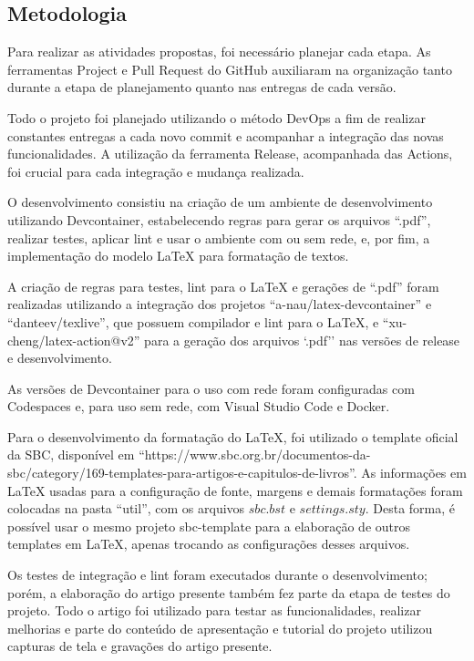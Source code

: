 \subsection{Metodologia}

Para realizar as atividades propostas, foi necessário planejar cada etapa. As ferramentas Project e Pull Request do GitHub auxiliaram na organização tanto durante a etapa de planejamento quanto nas entregas de cada versão.

Todo o projeto foi planejado utilizando o método DevOps a fim de realizar constantes entregas a cada novo commit e acompanhar a integração das novas funcionalidades. A utilização da ferramenta Release, acompanhada das Actions, foi crucial para cada integração e mudança realizada.

O desenvolvimento consistiu na criação de um ambiente de desenvolvimento utilizando Devcontainer, estabelecendo regras para gerar os arquivos ``.pdf'', realizar testes, aplicar lint e usar o ambiente com ou sem rede, e, por fim, a implementação do modelo LaTeX para formatação de textos.


A criação de regras para testes, lint para o LaTeX e gerações de ``.pdf'' foram realizadas utilizando a integração dos projetos ``a-nau/latex-devcontainer'' e ``danteev/texlive'', que possuem compilador e lint para o LaTeX, e ``xu-cheng/latex-action@v2'' para a geração dos arquivos `.pdf'' nas versões de release e desenvolvimento.

As versões de Devcontainer para o uso com rede foram configuradas com Codespaces e, para uso sem rede, com Visual Studio Code e Docker.

Para o desenvolvimento da formatação do LaTeX, foi utilizado o template oficial da SBC, disponível em ``https://www.sbc.org.br/documentos-da-sbc/category/169-templates-para-artigos-e-capitulos-de-livros''. As informações em LaTeX usadas para a configuração de fonte, margens e demais formatações foram colocadas na pasta ``util'', com os arquivos $sbc.bst$ e $settings.sty$. Desta forma, é possível usar o mesmo projeto sbc-template para a elaboração de outros templates em LaTeX, apenas trocando as configurações desses arquivos.

Os testes de integração e lint foram executados durante o desenvolvimento; porém, a elaboração do artigo presente também fez parte da etapa de testes do projeto. Todo o artigo foi utilizado para testar as funcionalidades, realizar melhorias e parte do conteúdo de apresentação e tutorial do projeto utilizou capturas de tela e gravações do artigo presente.